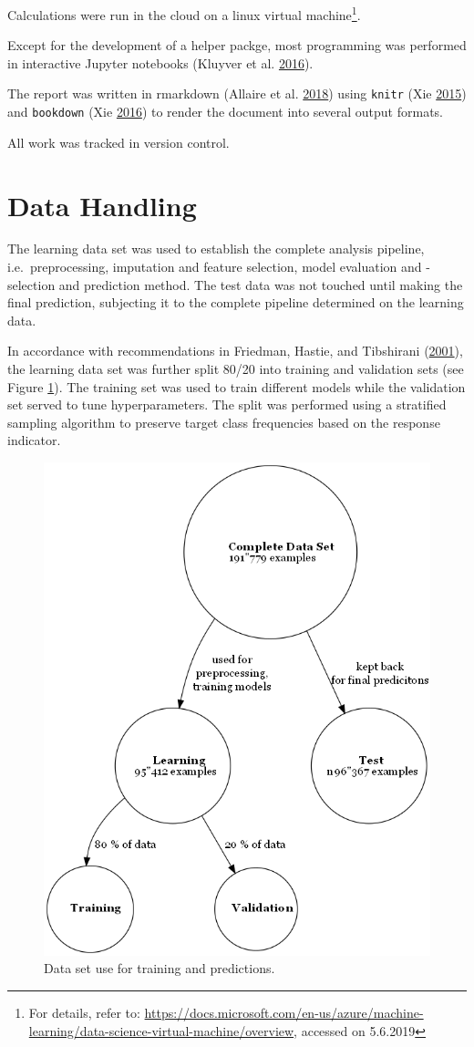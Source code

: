 \documentclass[
  11pt,
  a4paper,
  DIV=12,captions=tableheading,oneside,titlepage]{scrbook}
\begin{document}
Calculations were run in the cloud on a linux virtual machine\footnote{For details, refer to: \url{https://docs.microsoft.com/en-us/azure/machine-learning/data-science-virtual-machine/overview}, accessed on 5.6.2019}.

Except for the development of a helper packge, most programming was performed in interactive Jupyter notebooks (Kluyver et al. \protect\hyperlink{ref-Kluyver:2016aa}{2016}).

The report was written in rmarkdown (Allaire et al. \protect\hyperlink{ref-allaire2016rmarkdown}{2018}) using \texttt{knitr} (Xie \protect\hyperlink{ref-xie2015}{2015}) and \texttt{bookdown} (Xie \protect\hyperlink{ref-xie2016bookdown}{2016}) to render the document into several output formats.

All work was tracked in version control.

\hypertarget{data-handling}{%
\section{Data Handling}\label{data-handling}}

The learning data set was used to establish the complete analysis pipeline, i.e.~preprocessing, imputation and feature selection, model evaluation and -selection and prediction method. The test data was not touched until making the final prediction, subjecting it to the complete pipeline determined on the learning data.

In accordance with recommendations in Friedman, Hastie, and Tibshirani (\protect\hyperlink{ref-friedman2001elements}{2001}), the learning data set was further split 80/20 into training and validation sets (see Figure \ref{fig:data-splitting}). The training set was used to train different models while the validation set served to tune hyperparameters. The split was performed using a stratified sampling algorithm to preserve target class frequencies based on the response indicator.

\begin{figure}

{\centering \includegraphics[width=0.5\linewidth]{figures/methods/data-splitting} 

}

\caption{Data set use for training and predictions.}\label{fig:data-splitting}
\end{figure}
\end{document}
